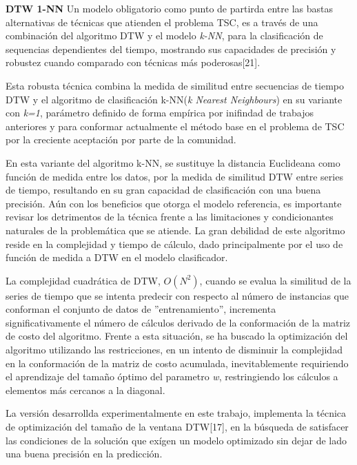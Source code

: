 \hfill\break
\justifying
\textbf{DTW 1-NN}
	\hfill\break
	\justifying
	Un modelo obligatorio como punto de partirda entre las bastas alternativas de técnicas que atienden el problema TSC, es a través de una combinación del algoritmo DTW y el modelo \textit{k-NN}, para la clasificación de sequencias dependientes del tiempo, mostrando sus capacidades de precisión y robustez cuando comparado con técnicas más poderosas[21].
	
	\hfill\break
	\justifying
	Esta robusta técnica combina la medida de similitud entre secuencias de tiempo DTW y el algoritmo de clasificación k-NN(\textit{k Nearest Neighbours}) en su variante con \textit{k=1}, parámetro definido de forma empírica por inifindad de trabajos anteriores y para conformar actualmente el método base en el problema de TSC por la creciente aceptación por parte de la comunidad.
	
	\hfill\break
	\justifying
	En esta variante del algoritmo k-NN, se sustituye la distancia Euclideana como función de medida entre los datos, por la medida de similitud DTW entre series de tiempo, resultando en su gran capacidad de clasificación con una buena precisión. Aún con los beneficios que otorga el modelo referencia, es importante revisar los detrimentos de la técnica frente a las limitaciones y condicionantes naturales de la problemática que se atiende. La gran debilidad de este algoritmo reside en la complejidad y tiempo de cálculo, dado principalmente por el uso de función de medida a DTW en el modelo clasificador.
	
	\hfill\break
	\justifying
	La complejidad cuadrática de DTW, $O(N^2)$, cuando se evalua la similitud de la series de tiempo que se intenta predecir con respecto al número de instancias que conforman el conjunto de datos de ''entrenamiento'', incrementa significativamente el número de cálculos derivado de la conformación de la matriz de costo del algoritmo. Frente a esta situación, se ha buscado la optimización del algoritmo utilizando las restricciones, en un intento de disminuir la complejidad en la conformación de la matriz de costo acumulada, inevitablemente requiriendo el aprendizaje del tamaño óptimo del parametro \textit{w}, restringiendo los cálculos a elementos más cercanos a la diagonal.
	
	\hfill\break
	\justifying
	La versión desarrollda experimentalmente en este trabajo, implementa la técnica de optimización del tamaño de la ventana DTW[17], en la búsqueda de satisfacer las condiciones de la solución que exígen un modelo optimizado sin dejar de lado una buena precisión en la predicción.
	
